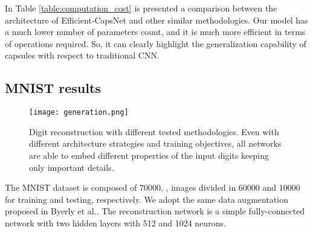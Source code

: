 \documentclass{article}
\begin{document}
In Table \ref{table:computation_cost} is presented a comparison between the architecture of Efficient-CapsNet and other similar methodologies. Our model has a much lower number of parameters count, and it is much more efficient in terms of operations required. So, it can clearly highlight the generalization capability of capsules with respect to traditional CNN.

\subsection{MNIST results}
\begin{figure}
    \centering
    \texttt{[image: generation.png]}
    \caption{Digit reconstruction with different tested methodologies. Even with different architecture strategies and training objectives, all networks are able to embed different properties of the input digits keeping only important details.}
    \label{fig:generation}
\end{figure}
The MNIST dataset \cite{lecun1998mnist} is composed of 70000, , images divided in 60000 and 10000 for training and testing, respectively. We adopt the same data augmentation proposed in Byerly et al.\cite{byerly2020branching}. The reconstruction network is a simple fully-connected network with two hidden layers with 512 and 1024 neurons.  
\end{document}
